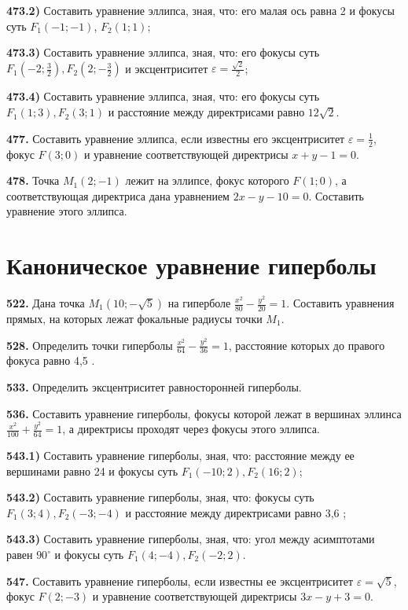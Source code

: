 \textbf{473.2)} Составить уравнение эллипса, зная, что: его малая ось равна 2 и фокусы суть $F_1(-1 ;-1)$, $F_2(1 ; 1)$;

\textbf{473.3)} Составить уравнение эллипса, зная, что: его фокусы суть $F_1\left(-2 ; \frac{3}{2}\right), F_2\left(2 ;-\frac{3}{2}\right)$ и эксцентриситет $\varepsilon=\frac{\sqrt{2}}{2}$;

\textbf{473.4)} Составить уравнение эллипса, зная, что: его фокусы суть $F_1(1 ; 3), F_2(3 ; 1)$ и расстояние между директрисами равно $12 \sqrt{2}$.

\textbf{477.} Составить уравнение эллипса, если известны его эксцентриситет $\varepsilon=\frac{1}{2}$, фокус $F(3 ; 0)$ и уравнение соответствующей директрисы $x+y-1=0$.

\textbf{478.} Точка $M_1(2 ;-1)$ лежит на эллипсе, фокус которого $F(1 ; 0)$, а соответствующая директриса дана уравнением $2 x-y-10=0$. Составить уравнение этого эллипса.



\section{Каноническое уравнение гиперболы}



\textbf{522.} Дана точка $M_1(10 ;-\sqrt{5})$ на гиперболе $\frac{x^2}{80}-\frac{y^2}{20}=1$. Составить уравнения прямых, на которых лежат фокальные радиусы точки $M_1$.

\textbf{528.} Определить точки гиперболы $\frac{x^2}{64}-\frac{y^2}{36}=1$, расстояние которых до правого фокуса равно 4,5 .

\textbf{533.} Определить эксцентриситет равносторонней гиперболы.

\textbf{536.} Составить уравнение гиперболы, фокусы которой лежат в вершинах эллинса $\frac{x^2}{100}+\frac{y^2}{64}=1$, а директрисы проходят через фокусы этого эллипса.

\textbf{543.1)} Составить уравнение гиперболы, зная, что: расстояние между ее вершинами равно 24 и фокусы суть $F_1(-10 ; 2), F_2(16 ; 2)$;

\textbf{543.2)} Составить уравнение гиперболы, зная, что: фокусы суть $F_1(3 ; 4), F_2(-3 ;-4)$ и расстояние между директрисами равно 3,6 ;

\textbf{543.3)} Составить уравнение гиперболы, зная, что: угол между асимптотами равен $90^{\circ}$ и фокусы суть $F_1(4 ;-4), F_2(-2 ; 2)$.

\textbf{547.} Составить уравнение гиперболы, если известны ее эксцентриситет $\varepsilon=\sqrt{5}$, фокус $F(2 ;-3)$ и уравнение соответствующей директрисы $3 x-y+3=0$.

